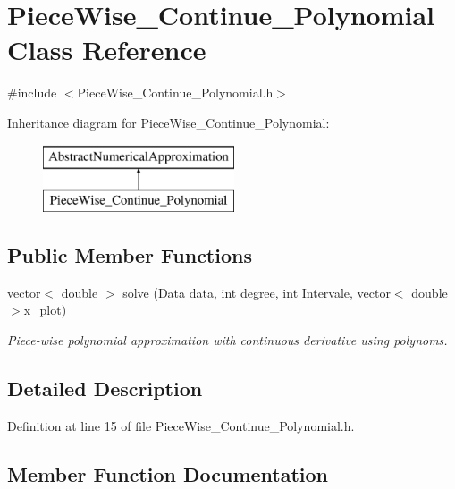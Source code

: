\hypertarget{class_piece_wise___continue___polynomial}{}\section{Piece\+Wise\+\_\+\+Continue\+\_\+\+Polynomial Class Reference}
\label{class_piece_wise___continue___polynomial}


{\ttfamily \#include $<$Piece\+Wise\+\_\+\+Continue\+\_\+\+Polynomial.\+h$>$}

Inheritance diagram for Piece\+Wise\+\_\+\+Continue\+\_\+\+Polynomial\+:\begin{figure}[H]
\begin{center}
\leavevmode
\includegraphics[height=2.000000cm]{class_piece_wise___continue___polynomial}
\end{center}
\end{figure}
\subsection*{Public Member Functions}
\begin{DoxyCompactItemize}
\item 
vector$<$ double $>$ \mbox{\hyperlink{class_piece_wise___continue___polynomial_a78a6e7994a1a007806da7d0cc8047413}{solve}} (\mbox{\hyperlink{struct_data}{Data}} data, int degree, int Intervale, vector$<$ double $>$x\+\_\+plot)
\begin{DoxyCompactList}\small\item\em Piece-\/wise polynomial approximation with continuous derivative using polynoms. \end{DoxyCompactList}\end{DoxyCompactItemize}


\subsection{Detailed Description}


Definition at line 15 of file Piece\+Wise\+\_\+\+Continue\+\_\+\+Polynomial.\+h.



\subsection{Member Function Documentation}
\mbox{\label{class_piece_wise___continue___polynomial_a78a6e7994a1a007806da7d0cc8047413}} 
